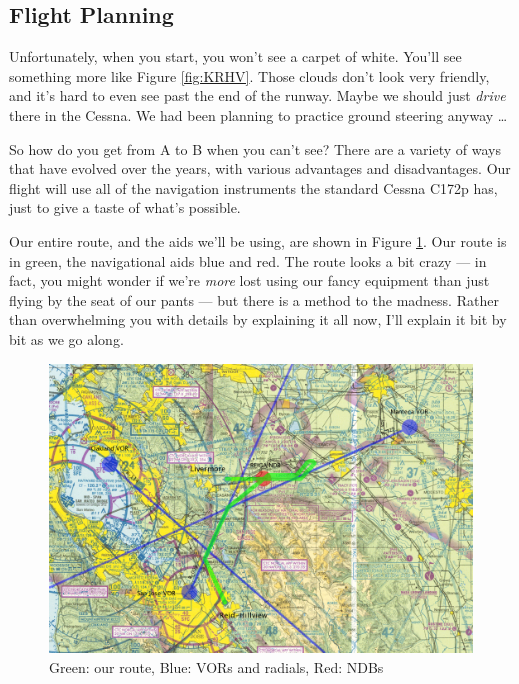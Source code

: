 \subsection{Flight Planning}

Unfortunately, when you start, you won't see a carpet of white.
You'll see something more like Figure \ref{fig:KRHV}.  Those clouds
don't look very friendly, and it's hard to even see past the end of
the runway.  Maybe we should just \emph{drive} there in the Cessna.
We had been planning to practice ground steering anyway \ldots{}

So how do you get from A to B when you can't see?  There are a variety
of ways that have evolved over the years, with various advantages and
disadvantages.  Our flight will use all of the navigation instruments
the standard Cessna C172p has, just to give a taste of what's
possible.

Our entire route, and the aids we'll be using, are shown in
Figure \ref{fig:sectional_labelled}.  Our route is in green, the
navigational aids blue and red.  The route looks a bit crazy --- in
fact, you might wonder if we're \emph{more} lost using our fancy
equipment than just flying by the seat of our pants --- but there is a
method to the madness.  Rather than overwhelming you with details by
explaining it all now, I'll explain it bit by bit as we go along.

\begin{figure}
  \begin{center}
    \includegraphics[width=20cm, angle=-90]{img/sectional_labelled}
    \caption{Green: our route, Blue: VORs and radials, Red: NDBs}
    \label{fig:sectional_labelled}
  \end{center}
\end{figure}


